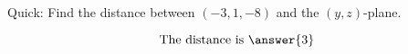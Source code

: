 \documentclass{ximera}
\author{Bart Snapp}
\begin{document}
\begin{exercise}
  Quick: Find the distance between $(-3,1,-8)$ and the $(y,z)$-plane.
  \begin{prompt}
  \[
  \text{The distance is }\answer{3}
  \]
  \end{prompt}
\end{exercise}
\end{document}
